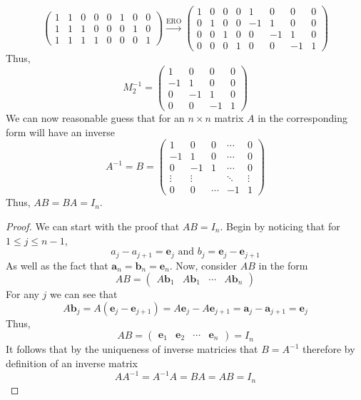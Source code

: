 \documentclass{exam}
\begin{document}
\begin{solution}
\[\begin{pmatrix}
            1 & 1 & 0 & 0 & 0 & 1 & 0 & 0 \\
            1 & 1 & 1 & 0 & 0 & 0 & 1 & 0 \\
            1 & 1 & 1 & 1 & 0 & 0 & 0 & 1
        \end{pmatrix}
        \xrightarrow{\text{ERO}}
        \begin{pmatrix}
            1 & 0 & 0 & 0 & 1 & 0 & 0 & 0 \\
            0 & 1 & 0 & 0 & -1 & 1 & 0 & 0 \\
            0 & 0 & 1 & 0 & 0 & -1 & 1 & 0 \\
            0 & 0 & 0 & 1 & 0 & 0 & -1 & 1 
        \end{pmatrix}
    \]
    Thus, 
    \[
        M_2^{-1} = \begin{pmatrix}
            1 & 0 & 0 & 0 \\ 
            -1 & 1 & 0 & 0 \\
            0 & -1 & 1 & 0 \\
            0 & 0 & -1 & 1
        \end{pmatrix}
    \]
    We can now reasonable guess that for an $n \times n$ matrix $A$ in the corresponding form will have an inverse 
    \[
        A^{-1} = B = \begin{pmatrix}
            1 & 0 & 0 & \cdots & 0 \\
            -1 & 1 & 0 & \cdots & 0 \\
            0 & -1 & 1 & \cdots & 0 \\
            \vdots & \vdots & & \ddots & \vdots \\
            0 & 0 & \cdots & -1 & 1
        \end{pmatrix}
    \]
    Thus, $AB = BA = I_n$.
    \begin{proof}
        We can start with the proof that $AB=I_n$. Begin by noticing that for $1 \leq j \leq n-1$, 
        \[a_j - a_{j+1} = \mathbf{e}_j \text{ and } b_j = \mathbf{e}_j - \mathbf{e}_{j+1}\]
        As well as the fact that $\mathbf{a}_n = \mathbf{b}_n = \mathbf{e}_n$. Now, consider $AB$ in the form 
        \[AB = \begin{pmatrix} A\mathbf{b}_1 & A\mathbf{b}_1 & \cdots & A\mathbf{b}_n \end{pmatrix}\]
        For any $j$ we can see that 
        \[A\mathbf{b}_j = A\left(\mathbf{e}_j - \mathbf{e}_{j+1}\right) = A\mathbf{e}_j - A\mathbf{e}_{j+1} = \mathbf{a}_j - \mathbf{a}_{j+1} = \mathbf{e}_j\]
        Thus, 
        \[AB = \begin{pmatrix} \mathbf{e}_1 & \mathbf{e}_2 & \cdots & \mathbf{e}_n \end{pmatrix} = I_n\]
        It follows that by the uniqueness of inverse matricies that $B = A^{-1}$ therefore by definition of an inverse matrix 
        \[
            AA^{-1} = A^{-1}A = BA = AB = I_n
        \]
    \end{proof}
\end{solution}

\end{document}

